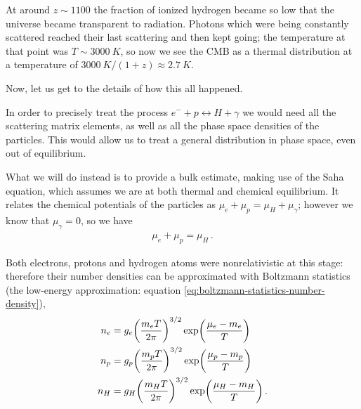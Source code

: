 \documentclass[main.tex]{subfiles}
\begin{document}
At around \(z \sim 1100\) the fraction of ionized hydrogen became so low that the universe became transparent to radiation. Photons which were being constantly scattered reached their last scattering and then kept going; the temperature at that point was \(T \sim \SI{3000}{K}\), so now we see the CMB as a thermal distribution at a temperature of \(\SI{3000}{K} / (1 + z) \approx \SI{2.7}{K}\).

Now, let us get to the details of how this all happened. 


In order to precisely treat the process \(e^{-} + p \leftrightarrow H + \gamma \) we would need all the scattering matrix elements, as well as all the phase space densities of the particles.
This would allow us to treat a general distribution in phase space, even out of equilibrium.

What we will do instead is to provide a bulk estimate, making use of the Saha equation, which assumes we are at both thermal and chemical equilibrium.
It relates the chemical potentials of the particles as \(\mu _e + \mu_p = \mu_H + \mu_\gamma \); however we know that \(\mu_{\gamma }=0\), so we have 
%
\begin{align}
\mu _e + \mu _p = \mu _H
\,.
\end{align}

Both electrons, protons and hydrogen atoms were nonrelativistic at this stage: therefore their number densities can be approximated with Boltzmann statistics (the low-energy approximation: equation \eqref{eq:boltzmann-statistics-number-density}),
%
\begin{align}
  n_e &= g_e \qty(\frac{m_e T}{2 \pi })^{3/2} \exp(\frac{\mu _e - m_e }{T})  \\
  n_p &= g_p \qty(\frac{m_p T}{2 \pi })^{3/2} \exp(\frac{\mu _p - m_p }{T})  \\
  n_H &= g_H \qty(\frac{m_H T}{2 \pi })^{3/2} \exp(\frac{\mu _H - m_H }{T}) 
  \,.
\end{align}
\end{document}
